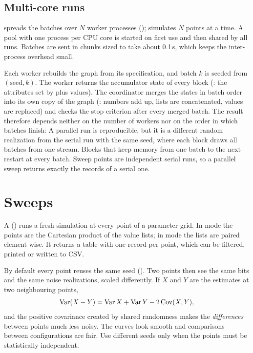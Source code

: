 \subsection{Multi-core runs}\label{sec:parallel}
 spreads the batches over $N$ worker processes
();  simulates $N$ points at a time. A pool
with one process per CPU core is started on first use and then shared by all runs. Batches are
sent in chunks sized to take about 0.1\,s, which keeps the inter-process overhead small.

Each worker rebuilds the graph from its specification, and batch $k$ is seeded from
$(\text{seed},k)$. The worker returns the accumulator state of every block
(: the attributes set by  plus  values). The
coordinator merges the states in batch order into its own copy of the graph
(: numbers add up, lists are concatenated,  values are replaced)
and checks the stop criterion after every merged batch. The result therefore depends neither
on the number of workers nor on the order in which batches finish:
A parallel run is reproducible, but it is a different random realization from the serial run
with the same seed, where each block draws all batches from one stream. Blocks that keep
memory from one batch to the next restart at every batch. Sweep points are independent serial
runs, so a parallel sweep returns exactly the records of a serial one.

\section{Sweeps}\label{sec:sweeps}
A  () runs a fresh simulation at every point of a parameter
grid. In  mode the points are the Cartesian product of the value lists; in
 mode the lists are paired element-wise. It returns a table with one record per
point, which can be filtered, printed or written to CSV.

\begin{keypoint}
By default every point reuses the same seed (). Two points then see the
same bits and the same noise realizations, scaled differently. If $X$ and $Y$ are the estimates
at two neighbouring points,
\[
  \operatorname{Var}(X-Y)=\operatorname{Var} X+\operatorname{Var} Y-2\operatorname{Cov}(X,Y),
\]
and the positive covariance created by shared randomness makes the \emph{differences} between
points much less noisy. The curves look smooth and comparisons between configurations are
fair. Use different seeds only when the points must be statistically independent.
\end{keypoint}

